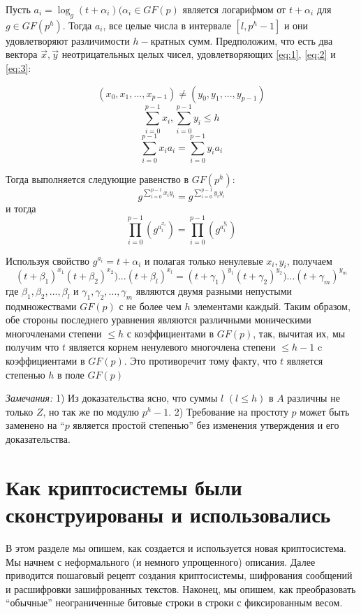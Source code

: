 \documentclass[a4paper,12pt]{article}
\newcommand{\DL}{\newline\newline}
\begin{document}
Пусть $a_i = \log_g{(t + \alpha_i)} (\alpha_i \in GF(p)$ является логарифмом от $t + \alpha_i$ для $g \in GF(p^h).$ Тогда $a_i$, все целые числа в интервале $[l, p^h - 1]$ и они удовлетворяют различимости $h-$кратных сумм. Предположим, что есть два вектора $\Vec{x}, \Vec{y}$ неотрицательных целых чисел, удовлетворяющих \eqref{eq:1}, \eqref{eq:2} и \eqref{eq:3}:

\begin{equation}
(x_0, x_1, ... , x_{p-1}) \neq (y_0, y_1, ..., y_{p-1}) \label{eq:1} 
\end{equation} 
\begin{equation}
\sum_{i = 0}^{p-1}x_i, \sum_{i = 0}^{p-1}y_i \leq h \label{eq:2} 
\end{equation} 
\begin{equation}
\sum_{i = 0}^{p-1}x_i a_i = \sum_{i = 0}^{p-1}y_i a_i\label{eq:3} 
\end{equation} 

Тогда выполняется следующие равенство в $GF(p^h)$: \newline
$$g^{\sum_{i = 0}^{p-1}x_i y_i} = g^{\sum_{i = 0}^{p-1}y_i y_i}$$
и тогда 
$$ \prod_{i = 0}^{p-1}(g^{a_i^{x_i}}) = \prod_{i = 0}^{p-1}(g^{a_i^{y_i}}) $$

Используя свойство $g^{a_i} = t + \alpha_i$ и полагая только ненулевые $x_i, y_i$, получаем 
$$ (t+\beta_1)^{x_1}(t+\beta_2)^{x_2})...(t+\beta_l)^{x_l} = (t+\gamma_1)^{y_1}(t+\gamma_2)^{y_2})...(t+\gamma_m)^{y_m}$$
где ${\beta_1,\beta_2, ..., \beta_l}$ и ${\gamma_1,\gamma_2, ..., \gamma_m}$ являются двумя разными непустыми подмножествами $GF(p)$ с не более чем $h$ элементами каждый. Таким образом, обе стороны последнего уравнения являются различными моническими многочленами степени $\leq h$ с коэффициентами в $GF(p)$, так, вычитая их, мы получим что $t$ является корнем ненулевого многочлена степени $\leq h-1$ c коэффициентами в $GF(p)$. Это противоречит тому факту, что $t$ является степенью $h$ в поле $GF(p)$\newline

\textsl{Замечания:} 1) Из доказательства ясно, что суммы $l$ $(l \leq h)$ в $A$ различны не только $Z$, но так же по модулю $p^h - 1$. 2) Требование на простоту $p$ может быть заменено на “$p$ является простой степенью” без изменения утверждения и его доказательства.\DL

\section{Как криптосистемы были сконструированы и использовались}
В этом разделе мы опишем, как создается и используется новая криптосистема. Мы начнем с неформального (и немного упрощенного) описания. Далее приводится пошаговый рецепт создания криптосистемы, шифрования сообщений и расшифровки зашифрованных текстов. Наконец, мы опишем, как преобразовать “обычные” неограниченные битовые строки в строки с фиксированным весом. \newline
\end{document}
